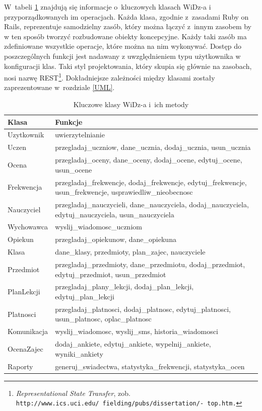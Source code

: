 \documentclass[12pt,leqno,twoside]{mwart}
\begin{document}
\indent W~tabeli \ref{kluczowe_klasy} znajdują się informacje o~kluczowych klasach WiDz-a i przyporządkowanych im operacjach. Każda klasa, zgodnie z~zasadami Ruby on Rails, reprezentuje samodzielny zasób, który można łączyć z~innym zasobem by w ten sposób tworzyć rozbudowane obiekty koncepcyjne. Każdy taki zasób ma zdefiniowane wszystkie operacje, które można na nim wykonywać. Dostęp do poszczególnych funkcji jest nadawany z uwzględnieniem typu użytkownika w konfiguracji klas. Taki styl projektowania, który skupia się głównie na zasobach, nosi nazwę REST\footnote{\textit{Representational State Transfer}, zob. \tt{http://www.ics.uci.edu/~fielding/pubs/dissertation/}\rm{-} \tt{top.htm}.}. Dokładniejsze zależności między klasami zostały zaprezentowane w~rozdziale \ref{UML}.
\begin{table}[h]
	\centering
	\caption{Kluczowe klasy WiDz-a i~ich metody}
		\rule{0pt}{3ex}
		\begin{tabular}{|l|p{12cm}|}
		\hline
		\textbf{Klasa} & \textbf{Funkcje} \\ \hline
		Uzytkownik & uwierzytelnianie \\ \hline
		Uczen & przegladaj\_uczniow, dane\_ucznia, dodaj\_ucznia, usun\_ucznia \\ \hline
		Ocena & przegladaj\_oceny, dane\_oceny, dodaj\_ocene, edytuj\_ocene, usun\_ocene \\ \hline
		Frekwencja & przegladaj\_frekwencje, dodaj\_frekwencje, edytuj\_frekwencje, usun\_frekwencje, usprawiedliw\_nieobecnosc \\ \hline
		Nauczyciel & przegladaj\_nauczycieli, dane\_nauczyciela, dodaj\_nauczyciela, edytuj\_nauczyciela, usun\_nauczyciela \\ \hline
		Wychowawca & wyslij\_wiadomosc\_uczniom \\ \hline
		Opiekun & przegladaj\_opiekunow, dane\_opiekuna \\ \hline
		Klasa & dane\_klasy, przedmioty, plan\_zajec, nauczyciele \\ \hline
		Przedmiot & przegladaj\_przedmioty, dane\_przedmiotu, dodaj\_przedmiot, edytuj\_przedmiot, usun\_przedmiot \\ \hline
		PlanLekcji & przegladaj\_plany\_lekcji, dodaj\_plan\_lekcji, edytuj\_plan\_lekcji \\ \hline
		Platnosci & przegladaj\_platnosci, dodaj\_platnosc, edytuj\_platnosci, usun\_platnosc, oplac\_platnosc \\ \hline
		Komunikacja & wyslij\_wiadomosc, wyslij\_sms, historia\_wiadomosci \\ \hline
		OcenaZajec & dodaj\_ankiete, edytuj\_ankiete, wypelnij\_ankiete, wyniki\_ankiety \\ \hline
		Raporty & generuj\_swiadectwa, statystyka\_frekwencji, statystyka\_ocen \\ \hline
		\end{tabular}
	\label{kluczowe_klasy}
\end{table}
\end{document}
